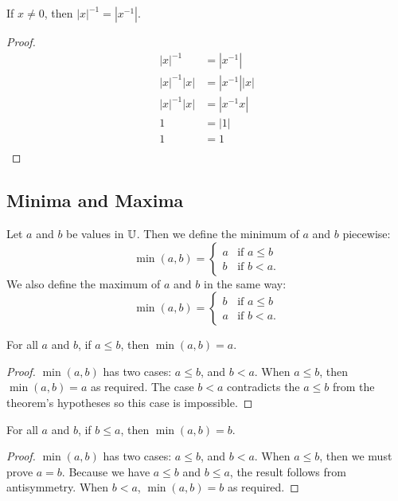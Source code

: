 \documentclass[../math.tex]{subfiles}
\begin{document}
\begin{theorem}
    If $x \neq 0$, then $|x|^{-1} = |x^{-1}|$.
\end{theorem}
\begin{proof}
    \begin{align*}
        |x|^{-1} &= |x^{-1}| \\
        |x|^{-1} |x| &= |x^{-1}| |x| \\
        |x|^{-1} |x| &= |x^{-1}x| \\
        1 &= |1| \\
        1 &= 1 \\
    \end{align*}
\end{proof}

\subsection{Minima and Maxima}

\begin{definition}
    Let $a$ and $b$ be values in $\mathbb{U}$.  Then we define the minimum of $a$ and
    $b$ piecewise:
    \[
        \min(a, b) = \begin{cases}
            a & \text{if $a \leq b$} \\
            b & \text{if $b < a$.}
        \end{cases}
    \]
    We also define the maximum of $a$ and $b$ in the same way:
    \[
        \min(a, b) = \begin{cases}
            b & \text{if $a \leq b$} \\
            a & \text{if $b < a$.}
        \end{cases}
    \]
\end{definition}

\begin{theorem}
    For all $a$ and $b$, if $a \leq b$, then $\min(a, b) = a$.
\end{theorem}
\begin{proof}
    $\min(a, b)$ has two cases: $a \leq b$, and $b < a$.  When $a \leq b$, then
    $\min(a, b) = a$ as required.  The case $b < a$ contradicts the $a \leq b$
    from the theorem's hypotheses so this case is impossible.
\end{proof}

\begin{theorem}
    For all $a$ and $b$, if $b \leq a$, then $\min(a, b) = b$.
\end{theorem}
\begin{proof}
    $\min(a, b)$ has two cases: $a \leq b$, and $b < a$.  When $a \leq b$, then
    we must prove $a = b$.  Because we have $a \leq b$ and $b \leq a$, the
    result follows from antisymmetry.  When $b < a$, $\min(a, b) = b$ as
    required.
\end{proof}
\end{document}
